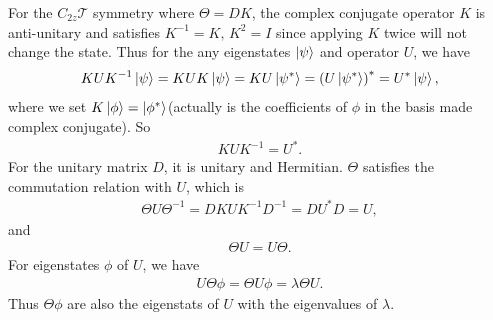 \documentclass[10pt, oneside]{article}
\newcommand{\ph}{\phi}
\newcommand{\p}[1]{\left(#1\right)}
\begin{document}
For the \(C_{2z} \mathcal{T}\) symmetry where \(\Theta = D K\), the complex conjugate operator \(K\) is anti-unitary and satisfies \(K^{-1} = K,\, K^2 = I\) since applying \(K\) twice will not change the state. Thus for the any eigenstates \(\ket{\psi}\) and operator \(U\), we have
\begin{align}
	K U K^{-1} \ket{\psi} = K U K  \ket{\psi} = K U \ket{\psi^*}  = \p{U \ket{\psi^*}}^* = U^* \ket{\psi},
\end{align}
where we set \(K \ket{\ph} = \ket{\ph^*}\)(actually is the coefficients of \(\ph\) in the basis made complex conjugate). So 
\begin{align}
	K U K^{-1} = U^{*}.
\end{align}
For the unitary matrix \(D\), it is unitary and Hermitian. \(\Theta\) satisfies the commutation relation with \(U\), which is 
\begin{align}
	\Theta U \Theta^{-1} = D K U K ^{-1} D^{-1} = D U^{*} D = U,
\end{align} 
and 
\begin{align}
	\Theta U = U \Theta.
\end{align}
For eigenstates \(\phi\) of \(U\), we have
\begin{align}
	U \Theta \phi = \Theta U \phi = \lambda \Theta U.
\end{align}
Thus \(\Theta \phi\) are also the eigenstats of \(U\) with the eigenvalues of \(\lambda\).
\end{document}
